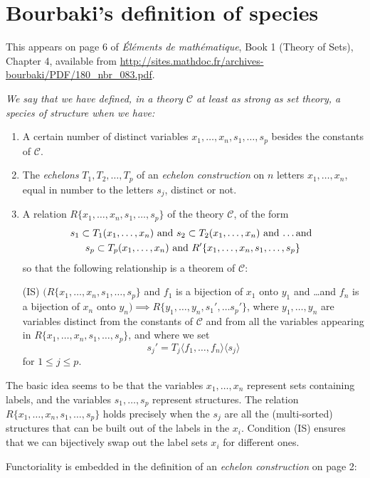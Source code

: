 \documentclass{amsart}
\theoremstyle{definition}
\theoremstyle{remark}
\begin{document}



\appendix
\section{Bourbaki's definition of species}
\label{sec:appendix-bourbaki}

\begin{commentary}
  This appears on page 6 of \emph{\'El\'ements de math\'ematique},
  Book 1 (Theory of Sets), Chapter 4, available from
  \url{http://sites.mathdoc.fr/archives-bourbaki/PDF/180_nbr_083.pdf}.

\begingroup \itshape
We say that we have defined, in a theory $\mathcal{C}$ at least as
strong as set theory, a \emph{species of structure} when we have:

\begin{enumerate}
\item A certain number of distinct variables $x_1, \dots, x_n, s_1,
  \dots, s_p$ besides the constants of $\mathcal{C}$.
\item The \emph{echelons} $T_1, T_2, \dots, T_p$ of an \emph{echelon
    construction} on $n$ letters $x_1, \dots, x_n$, equal in number to
  the letters $s_j$, distinct or not.
\item A relation $R\{x_1, \dots, x_n, s_1, \dots, s_p\}$ of the theory
  $\mathcal{C}$, of the form
  \begin{multline*}
    s_1 \subset T_1(x_1, \dots, x_n) \text{ and } s_2 \subset T_2(x_1,
    \dots, x_n) \text{ and \dots and } \\
    s_p \subset T_p(x_1, \dots, x_n) \text{ and } R'\{x_1, \dots, x_n,
    s_1, \dots, s_p\}
  \end{multline*}
  so that the following relationship is a theorem of $\mathcal{C}$:

  (IS) $(R\{x_1, \dots, x_n, s_1, \dots, s_p\}$ and $f_1$ is a
  bijection of $x_1$ onto $y_1$ and \dots and $f_n$ is a bijection of
  $x_n$ onto $y_n) \implies R\{y_1, \dots, y_n, s_1', \dots s_p'\}$,
  where $y_1, \dots, y_n$ are variables distinct from the constants of
  $\mathcal{C}$ and from all the variables appearing in $R\{x_1,
  \dots, x_n, s_1, \dots, s_p\}$, and where we set \[ s_j' =
  T_j\langle f_1, \dots, f_n\rangle \langle s_j \rangle \] for $1 \leq
  j \leq p$.
\end{enumerate}
\endgroup

The basic idea seems to be that the variables $x_1, \dots, x_n$
represent sets containing labels, and the variables $s_1, \dots, s_p$
represent structures.  The relation $R\{x_1, \dots, x_n, s_1, \dots,
s_p\}$ holds precisely when the $s_j$ are all the (multi-sorted)
structures that can be built out of the labels in the $x_i$.
Condition (IS) ensures that we can bijectively swap out the label sets
$x_i$ for different ones.

Functoriality is embedded in the definition of an \emph{echelon
  construction} on page 2:

\end{commentary}
\end{document}

